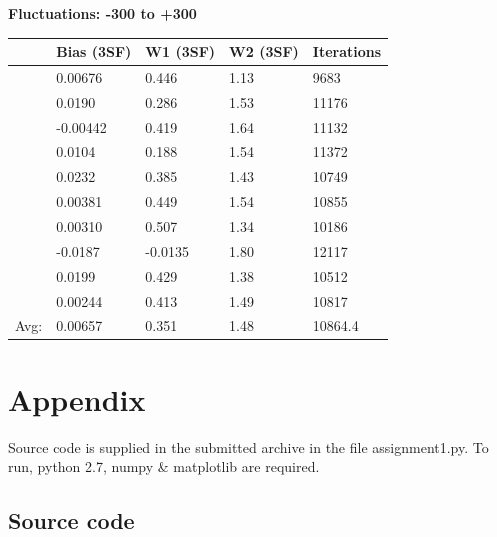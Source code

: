 \documentclass{article}
\begin{document}
\begin{center}
    \textbf{Fluctuations: -300 to +300}        \\
    \begin{tabular}{ r | l | l | l | l }
        \hline
        & Bias (3SF) & W1 (3SF) & W2 (3SF) & Iterations \\
        \hline
& 0.00676& 0.446& 1.13& 9683 \\
& 0.0190& 0.286& 1.53& 11176 \\
& -0.00442& 0.419& 1.64& 11132 \\
& 0.0104& 0.188& 1.54& 11372 \\
& 0.0232& 0.385& 1.43& 10749 \\
& 0.00381& 0.449& 1.54& 10855 \\
& 0.00310& 0.507& 1.34& 10186 \\
& -0.0187& -0.0135& 1.80& 12117 \\
& 0.0199& 0.429& 1.38& 10512 \\
& 0.00244& 0.413& 1.49& 10817 \\
        \hline
        Avg: & 0.00657& 0.351& 1.48&10864.4\\
        \hline
    \end{tabular}
\end{center}

\section*{Appendix}
Source code is supplied in the submitted archive in the file assignment1.py. To run, python 2.7, numpy \& matplotlib are required.

\subsection*{Source code}
\end{document}

